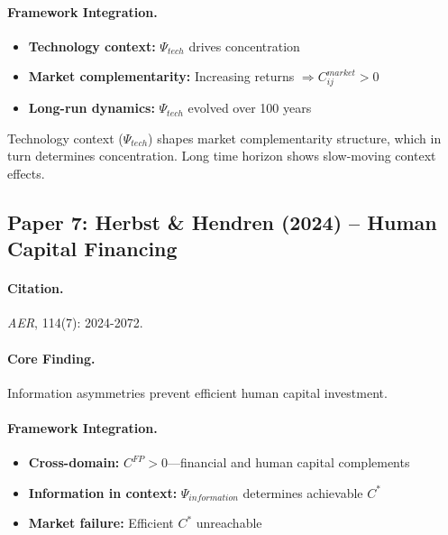 \paragraph{Framework Integration.}
\begin{itemize}
  \item \textbf{Technology context:} $\Psi_{tech}$ drives concentration
  \item \textbf{Market complementarity:} Increasing returns $\Rightarrow C_{ij}^{market} > 0$
  \item \textbf{Long-run dynamics:} $\Psi_{tech}$ evolved over 100 years
\end{itemize}

\begin{tcolorbox}[colback=yellow!5!white, colframe=yellow!75!black,
    title=EBF Insight: Market Structure]
Technology context ($\Psi_{tech}$) shapes market complementarity structure,
which in turn determines concentration. Long time horizon shows slow-moving
context effects.
\end{tcolorbox}


\subsection{Paper 7: Herbst \& Hendren (2024) -- Human Capital Financing}

\paragraph{Citation.}
\emph{AER}, 114(7): 2024-2072.

\paragraph{Core Finding.}
Information asymmetries prevent efficient human capital investment.

\paragraph{Framework Integration.}
\begin{itemize}
  \item \textbf{Cross-domain:} $C^{FP} > 0$---financial and human capital complements
  \item \textbf{Information in context:} $\Psi_{information}$ determines achievable $C^*$
  \item \textbf{Market failure:} Efficient $C^*$ unreachable
\end{itemize}

